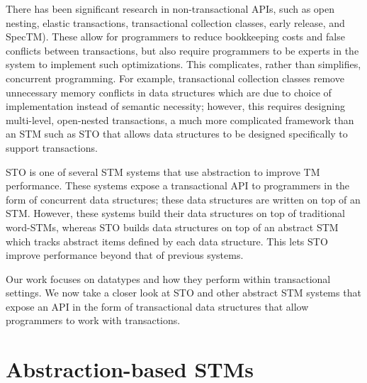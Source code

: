 There has been significant research in non-transactional APIs, such as open nesting\cite{opennesting}, elastic transactions\cite{elastic}, transactional collection classes\cite{tcc}, early release\cite{earlyrelease}, and SpecTM\cite{spectm}). These allow for programmers to reduce bookkeeping costs and false conflicts between transactions, but also require programmers to be experts in the system to implement such optimizations. This complicates, rather than simplifies, concurrent programming. For example, transactional collection classes remove unnecessary memory conflicts in data structures which are due to choice of implementation instead of semantic necessity; however, this requires designing multi-level, open-nested transactions, a much more complicated framework than an STM such as STO that allows data structures to be designed specifically to support transactions.

STO is one of several STM systems that use abstraction to improve TM performance\cite{boost}\cite{optboost}\cite{autolock}\cite{predication}. These systems expose a transactional API to programmers in the form of concurrent data structures; these data structures are written on top of an STM. However, these systems build their data structures on top of traditional word-STMs, whereas STO builds data structures on top of an abstract STM which tracks abstract items defined by each data structure. This lets STO improve performance beyond that of previous systems. 

Our work focuses on datatypes and how they perform within transactional settings. We now take a closer look at STO and other abstract STM systems that expose an API in the form of transactional data structures that allow programmers to work with transactions.

\section{Abstraction-based STMs}

